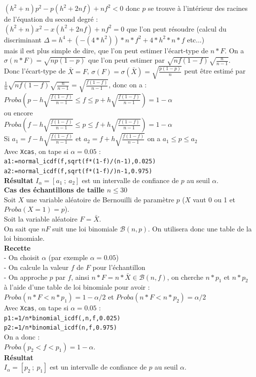 \documentclass[a4paper,11pt]{book}
\begin{document}
$(h^2+n)p^2-p(h^2+2nf)+nf^2<0$ donc $p$ se trouve \`a l'int\'erieur des 
racines de l'\'equation du second degr\'e :\\
$(h^2+n)x^2-x(h^2+2nf)+nf^2=0$ que 
l'on peut r\'esoudre (calcul du discriminant $\Delta=h^4+(-(4*h^2))*n*f^2+4*h^2*n*f$ etc...)\\
 mais il est plus simple de dire, que l'on peut estimer l'\'ecart-type de
 $n*F$. On a $\sigma(n*F)=\sqrt{np(1-p)}$ que l'on peut estimer par
 $\sqrt{nf(1-f)}\sqrt{\frac{n}{n-1}}$. \\
Donc l'\'ecart-type de $\bar X=F$, 
$\sigma(F)=\sigma(\bar X)=\sqrt{\frac{p(1-p)}{n}}$ peut \^etre estim\'e par \\
$\frac{1}{n}\sqrt{nf(1-f)}\sqrt{\frac{n}{n-1}} =\sqrt{\frac{f(1-f)}{n-1}}$,
donc on a :\\
$Proba(p-h\sqrt{\frac{f(1-f)}{n-1}}\leq f\leq p+h\sqrt{\frac{f(1-f)}{n-1}} )=1-\alpha$\\
ou encore \\
$Proba(f-h\sqrt{\frac{f(1-f)}{n-1}}\leq p\leq f+h\sqrt{\frac{f(1-f)}{n-1}} )=1-\alpha$\\
Si $a_1=f-h\sqrt{\frac{f(1-f)}{n-1}}$ et $a_2=f+h\sqrt{\frac{f(1-f)}{n-1}}$
on a $a_1 \leq p \leq a_2$\\
Avec {\tt Xcas}, on tape  si $\alpha=0.05$ :\\
{\tt a1:=normal\_icdf(f,sqrt(f*(1-f)/(n-1),0.025)}\\
{\tt a2:=normal\_icdf(f,sqrt(f*(1-f)/)n-1,0.975)}\\
{\bf R\'esultat}
$I_{\alpha}=[a_1\ ;\ a_2]$ est un intervalle de confiance de $p$ au seuil 
$\alpha$.\\ 
{\bf Cas des \'echantillons de taille $n\leq 30$}\\
Soit $X$ une variable al\'eatoire de Bernouilli de param\`etre $p$ ($X$ vaut 0 
ou 1 et $Proba(X=1)=p$).\\
Soit la variable al\'eatoire $F=\bar X$.\\
On sait que $nF$ suit une loi binomiale $\mathcal B(n,p)$. 
On utilisera donc une table de la loi binomiale.\\ 
{\bf Recette}\\
- On choisit $\alpha$ (par exemple $\alpha=0.05$)\\
- On calcule la valeur $f$ de $F$ pour l'\'echantillon\\
- On approche $p$ par $f$, ainsi $n*F=n*\bar X\in \mathcal B(n,f)$, on cherche 
$n*p_1$ et $n*p_2$ \`a l'aide d'une table de loi binomiale pour avoir :\\
$Proba(n*F<n*p_1)=1-\alpha/2$ et $Proba(n*F<n*p_2)=\alpha/2$\\
Avec {\tt Xcas}, on tape  si $\alpha=0.05$ :\\
{\tt p1:=1/n*binomial\_icdf(,n,f,0.025)}\\
{\tt p2:=1/n*binomial\_icdf(n,f,0.975)}\\
On a donc :\\
$Proba(p_2<f<p_1)=1-\alpha$.\\
{\bf R\'esultat}\\
$I_{\alpha}=[p_2\ ;\ p_1]$ est un intervalle de confiance de $p$ au seuil 
$\alpha$.
\end{document}
